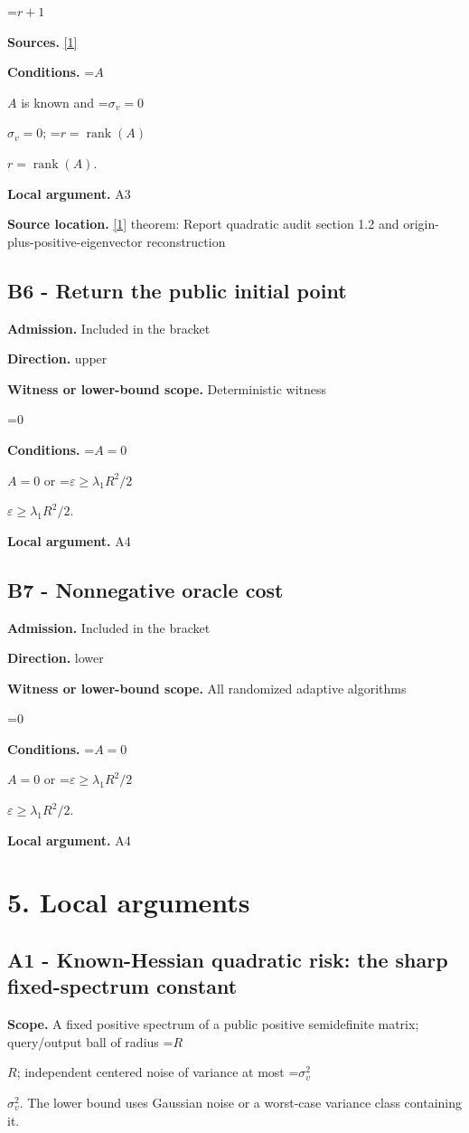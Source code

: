 \documentclass[10pt,a4paper]{article}
\newcommand{\AtlasMath}[1]{\par\begingroup\centering\setbox0=\hbox{$\displaystyle #1$}\ifdim\wd0>1.4\linewidth\typeout{ATLAS WIDE FORMULA: \the\wd0}\fi\ifdim\wd0>\linewidth\resizebox{\linewidth}{!}{\box0}\else\box0\fi\par\endgroup}
\newcommand{\AtlasInlineMath}[1]{\begingroup\setbox0=\hbox{$#1$}\ifdim\wd0>.4\linewidth\endgroup\AtlasMath{#1}\else\endgroup$#1$\fi}
\begin{document}
\AtlasMath{r+1}
\textbf{Sources.} \href{https://proceedings.neurips.cc/paper_files/paper/2023/file/6e60a9023d2c63f7f0856910129ae753-Paper-Conference.pdf}{[1]}

\textbf{Conditions.} \AtlasInlineMath{A} is known and \AtlasInlineMath{\sigma_v=0}; \AtlasInlineMath{r=\operatorname{rank}(A)}.

\textbf{Local argument.} A3

\textbf{Source location.} \href{https://proceedings.neurips.cc/paper_files/paper/2023/file/6e60a9023d2c63f7f0856910129ae753-Paper-Conference.pdf}{[1]} theorem: Report quadratic audit section 1.2 and origin-plus-positive-eigenvector reconstruction

\subsection{B6 - Return the public initial point}
\textbf{Admission.} Included in the bracket

\textbf{Direction.} upper

\textbf{Witness or lower-bound scope.} Deterministic witness

\AtlasMath{0}
\textbf{Conditions.} \AtlasInlineMath{A=0} or \AtlasInlineMath{\varepsilon\ge\lambda_1R^2/2}.

\textbf{Local argument.} A4

\subsection{B7 - Nonnegative oracle cost}
\textbf{Admission.} Included in the bracket

\textbf{Direction.} lower

\textbf{Witness or lower-bound scope.} All randomized adaptive algorithms

\AtlasMath{0}
\textbf{Conditions.} \AtlasInlineMath{A=0} or \AtlasInlineMath{\varepsilon\ge\lambda_1R^2/2}.

\textbf{Local argument.} A4

\section{5. Local arguments}
\subsection{A1 - Known-Hessian quadratic risk: the sharp fixed-spectrum constant}
\textbf{Scope.} A fixed positive spectrum of a public positive semidefinite matrix; query/output ball of radius \AtlasInlineMath{R}; independent centered noise of variance at most \AtlasInlineMath{\sigma_v^2}. The lower bound uses Gaussian noise or a worst-case variance class containing it.
\end{document}
